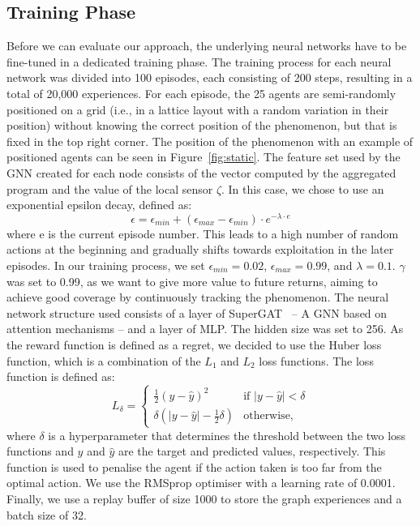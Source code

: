 \documentclass[conference]{IEEEtran}
\begin{document}
\subsection{Training Phase}
Before we can evaluate our approach, the underlying neural networks have to be fine-tuned in a dedicated training phase.
The training process for each neural network was divided into 100 episodes, each consisting of 200 steps, resulting in a total of 20,000 experiences.
%
For each episode, 
 the 25 agents are semi-randomly positioned on a grid (i.e., in a lattice layout with a random variation in their position) without knowing the correct position of the phenomenon, 
 but that is fixed in the top right corner. The position of the phenomenon with an example of positioned agents can be seen in Figure~\ref{fig:static}. 
 The feature set used by the \ac{GNN} created for each node consists of the vector computed by the aggregated program and the value of the local sensor $\zeta$.
%
In this case, we chose to use an exponential epsilon decay, defined as:
\begin{equation*}
\epsilon = \epsilon_{min} + (\epsilon_{max} - \epsilon_{min}) \cdot e^{-\lambda \cdot e}
\end{equation*}
where e is the current episode number. 
This leads to a high number of random actions at the beginning and gradually shifts towards exploitation in the later episodes. 
%
In our training process, 
 we set $\epsilon_{min} = 0.02$, $\epsilon_{max} = 0.99$, and $\lambda = 0.1$.
$\gamma$ was set to 0.99, 
 as we want to give more value to future returns, 
 aiming to achieve good coverage by continuously tracking the phenomenon. 
The neural network structure used consists of a layer of SuperGAT~\cite{DBLP:journals/corr/abs-2204-04879} -- A \ac{GNN} based on attention mechanisms -- and a layer of MLP. 
The hidden size was set to 256.
%
As the reward function is defined as a regret, 
 we decided to use the Huber loss function, %
 which is a combination of the $L_1$ and $L_2$ loss functions.
%
The loss function is defined as:
\begin{equation*}
L_\delta = \begin{cases}
  \frac{1}{2} (y - \hat{y})^2 & \text{if } |y - \hat{y}| < \delta \\
  \delta (|y - \hat{y}| - \frac{1}{2} \delta) & \text{otherwise,} 
 \end{cases}
\end{equation*}
where $\delta$ is a hyperparameter that determines the threshold between the two loss functions and $y$ and $\hat{y}$ are the target and predicted values, respectively.
This function is used to penalise the agent if the action taken is too far from the optimal action. 
%
We use the RMSprop optimiser with a learning rate of 0.0001.
%
Finally, we use a replay buffer of size 1000 to store the graph experiences and a batch size of 32.
\end{document}
